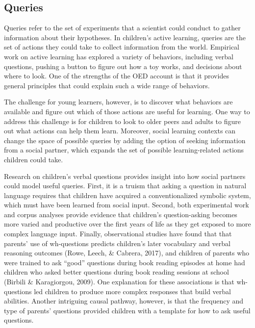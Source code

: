\documentclass[oneside]{report}
\begin{document}
\subsection{Queries}\label{queries}

Queries refer to the set of experiments that a scientist could conduct
to gather information about their hypotheses. In children's active
learning, queries are the set of actions they could take to collect
information from the world. Empirical work on active learning has
explored a variety of behaviors, including verbal questions, pushing a
button to figure out how a toy works, and decisions about where to look.
One of the strengths of the OED account is that it provides general
principles that could explain such a wide range of behaviors.

The challenge for young learners, however, is to discover what behaviors
are available and figure out which of those actions are useful for
learning. One way to address this challenge is for children to look to
older peers and adults to figure out what actions can help them learn.
Moreover, social learning contexts can change the space of possible
queries by adding the option of seeking information from a social
partner, which expands the set of possible learning-related actions
children could take.

Research on children's verbal questions provides insight into how social
partners could model useful queries. First, it is a truism that asking a
question in natural language requires that children have acquired a
conventionalized symbolic system, which must have been learned from
social input. Second, both experimental work and corpus analyses provide
evidence that children's question-asking becomes more varied and
productive over the first years of life as they get exposed to more
complex language input. Finally, observational studies have found that
that parents' use of wh-questions predicts children's later vocabulary
and verbal reasoning outcomes (Rowe, Leech, \& Cabrera, 2017), and
children of parents who were trained to ask ``good'' questions during
book reading episodes at home had children who asked better questions
during book reading sessions at school (Birbili \& Karagiorgou, 2009).
One explanation for these associations is that wh-questions led children
to produce more complex responses that build verbal abilities. Another
intriguing causal pathway, however, is that the frequency and type of
parents' questions provided children with a template for how to ask
useful questions.
\end{document}
